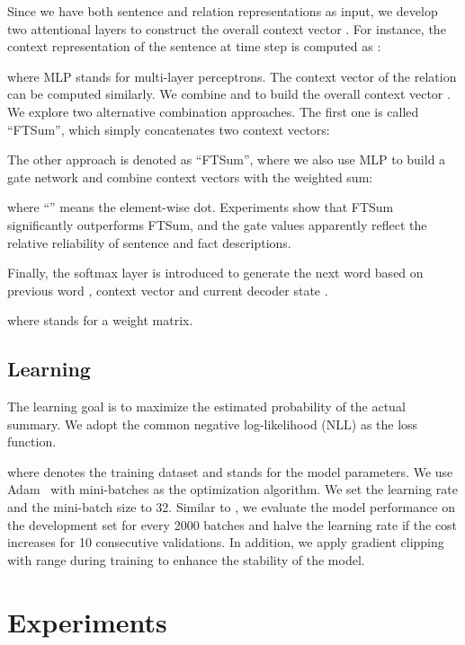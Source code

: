\documentclass[letterpaper]{article} \usepackage{aaai18}  \usepackage{times}  \usepackage{helvet}  \usepackage{courier}  \usepackage{url}  \usepackage{graphicx}  \usepackage{amsfonts}
\begin{document}
	Since we have both sentence and relation representations as input, we develop two attentional layers to construct the overall context vector . 
For instance, the context representation of the sentence at time step  is computed as \cite{luong2015effective}:
	
	where MLP stands for multi-layer perceptrons.
	The context vector of the relation  can be computed similarly.
	We combine  and  to build the overall context vector .
	We explore two alternative combination approaches.
	The first one is called ``FTSum'', which simply concatenates two context vectors: 
	
	The other approach is denoted as ``FTSum'', where we also use MLP to build a gate network and combine context vectors with the weighted sum:
	
	where ``'' means the element-wise dot.
	Experiments show that FTSum significantly outperforms FTSum, and the gate values apparently reflect the relative reliability of sentence and fact descriptions. 
	
	Finally, the softmax layer is introduced to generate the next word based on previous word , context vector  and current decoder state .
	
	where  stands for a weight matrix.
	
	\subsection{Learning}
	The learning goal is to maximize the estimated probability of the actual summary. 
	We adopt the common negative log-likelihood (NLL) as the loss function.
	
	where  denotes the training dataset and  stands for the model parameters.
	We use Adam~\cite{kingma2014adam} with mini-batches as the optimization algorithm. 
	We set the learning rate  and the mini-batch size to 32.
	Similar to \cite{zhou2017selective}, we evaluate the model performance on the development set for every 2000 batches and halve the learning rate if the cost increases for 10 consecutive validations. 
	In addition, we apply gradient clipping \cite{pascanu2013difficulty} with range  during training to enhance the stability of the model.
	
	
	\section{Experiments}
\end{document}
